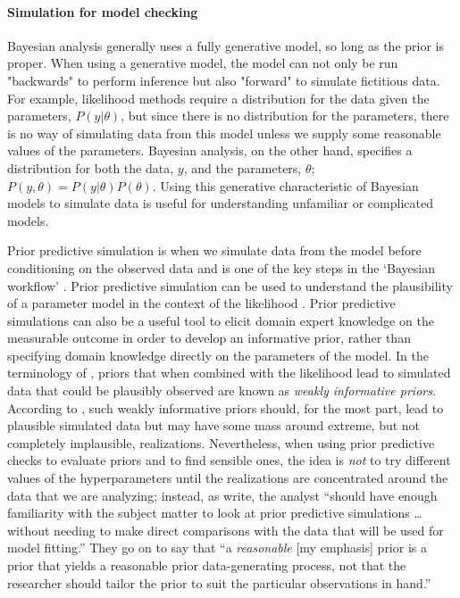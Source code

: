 \paragraph*{Simulation for model checking}

Bayesian analysis generally uses a fully generative model, so long as the prior is proper. When using a generative model, the model can not only be run "backwards" to perform inference but also "forward" to simulate fictitious data. For example, likelihood methods require a distribution for the data given the parameters, $P(y|\theta)$, but since there is no distribution for the parameters, there is no way of simulating data from this model unless we supply some reasonable values of the parameters. Bayesian analysis, on the other hand, specifies a distribution for both the data, $y$, and the parameters, $\theta$; $P(y, \theta) = P(y|\theta)P(\theta)$. Using this generative characteristic of Bayesian models to simulate data is useful for understanding unfamiliar or complicated models.

Prior predictive simulation is when we simulate data from the model before conditioning on the observed data and is one of the key steps in the `Bayesian workflow' \citep[Figure ~1]{gelman_workflow_2020}. Prior predictive simulation can be used to understand the plausibility of a parameter model in the context of the likelihood \citep{gelman_2017}. Prior predictive simulations can also be a useful tool to elicit domain expert knowledge on the measurable outcome in order to develop an informative prior, rather than specifying domain knowledge directly on the parameters of the model. In the terminology of \cite{gabry_vis_2019}, priors that when combined with the likelihood lead to simulated data that could be plausibly observed are known as \textit{weakly informative priors}. According to \cite{gabry_vis_2019}, such weakly informative priors should, for the most part, lead to plausible simulated data but may have some mass around extreme, but not completely implausible, realizations. Nevertheless, when using prior predictive checks to evaluate priors and to find sensible ones, the idea is \textit{not} to try different values of the hyperparameters until the realizations are concentrated around the data that we are analyzing; instead, as \cite{gabry_vis_2019a} write, the analyst ``should have enough familiarity with the subject matter to look at prior predictive simulations \ldots without needing to make direct comparisons with the data that will be used for model fitting.'' They go on to say that ``a \textit{reasonable} [my emphasis] prior is a prior that yields a reasonable prior data-generating process, not that the researcher should tailor the prior to suit the particular observations in hand.''

